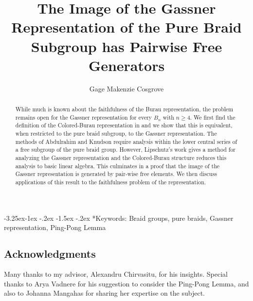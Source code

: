 \documentclass[11pt]{article}
\title{The Image of the Gassner Representation of the Pure Braid Subgroup has Pairwise Free Generators}
\author{Gage Makenzie Cosgrove}
\begin{document}
	\maketitle
	\begin{abstract}
		\noindent While much is known about the faithfulness of the Burau representation, the problem remains open for the Gassner representation for every $B_n$ with $n\geq 4$. We first find the definition of the Colored-Burau representation in \cite{aagl} and we show that this is equivalent, when restricted to the pure braid subgroup, to the Gassner representation. The methods of Abdulrahim \cite{phdthesis} and Knudson \cite{knudson} require analysis within the lower central series of a free subgroup of the pure braid group. However, Lipschutz's work \cite{lip} gives a method for analyzing the Gassner representation and the Colored-Burau structure reduces this analysis to basic linear algebra. This culminates in a proof that the image of the Gassner representation is generated by pair-wise free elements. We then discuss applications of this result to the faithfulness problem of the representation.
	\end{abstract}

\makeatletter
\renewcommand\subsubsection{\@startsection{subsubsection}{3}{\z@}%
	{-3.25ex\@plus -1ex \@minus -.2ex}%
	{-1.5ex \@plus -.2ex}%
	{\normalfont\normalsize\bfseries}}

\subsubsection*{Keywords:}
Braid groups, pure braids, Gassner representation, Ping-Pong Lemma

\makeatother 

\subsection*{Acknowledgments}
Many thanks to my advisor, Alexandru Chirvasitu, for his insights. Special thanks to Arya Vadnere for his suggestion to consider the Ping-Pong Lemma, and also to Johanna Mangahas for sharing her expertise on the subject.
\end{document}
